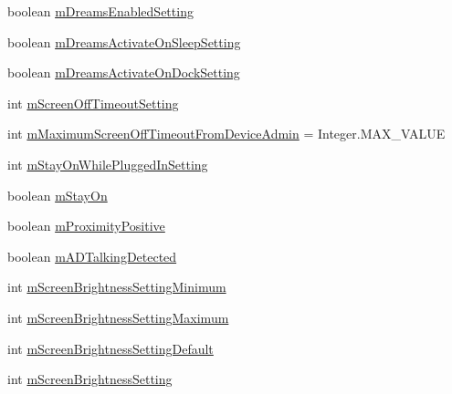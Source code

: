 \begin{DoxyCompactItemize}
\item 
boolean \hyperlink{classcom_1_1android_1_1server_1_1power_1_1PowerManagerService_a17c84b001198d25bddfbcd8cbc95dfa5}{m\-Dreams\-Enabled\-Setting}
\item 
boolean \hyperlink{classcom_1_1android_1_1server_1_1power_1_1PowerManagerService_a3c5fd5e8ef073be5e16dc75a0be9ee72}{m\-Dreams\-Activate\-On\-Sleep\-Setting}
\item 
boolean \hyperlink{classcom_1_1android_1_1server_1_1power_1_1PowerManagerService_a95fc861cdbe061af7dac579eee692186}{m\-Dreams\-Activate\-On\-Dock\-Setting}
\item 
int \hyperlink{classcom_1_1android_1_1server_1_1power_1_1PowerManagerService_aff54ed9e71f038ade439d18f68df1693}{m\-Screen\-Off\-Timeout\-Setting}
\item 
int \hyperlink{classcom_1_1android_1_1server_1_1power_1_1PowerManagerService_a4568ee32633119012abb8ba1778d322d}{m\-Maximum\-Screen\-Off\-Timeout\-From\-Device\-Admin} = Integer.\-M\-A\-X\-\_\-\-V\-A\-L\-U\-E
\item 
int \hyperlink{classcom_1_1android_1_1server_1_1power_1_1PowerManagerService_a6315de1c3522ae67c89c610c3ad25027}{m\-Stay\-On\-While\-Plugged\-In\-Setting}
\item 
boolean \hyperlink{classcom_1_1android_1_1server_1_1power_1_1PowerManagerService_a6232e1f32f3426014adc0bed62d0cb4f}{m\-Stay\-On}
\item 
boolean \hyperlink{classcom_1_1android_1_1server_1_1power_1_1PowerManagerService_a59d076d6594a3fad788a4cb2995eb193}{m\-Proximity\-Positive}
\item 
boolean \hyperlink{classcom_1_1android_1_1server_1_1power_1_1PowerManagerService_ab1be0e2ea03340f9160d118ab2bed62f}{m\-A\-D\-Talking\-Detected}
\item 
int \hyperlink{classcom_1_1android_1_1server_1_1power_1_1PowerManagerService_adda72145b07d6ed10a9d3c5e4fe3b0ff}{m\-Screen\-Brightness\-Setting\-Minimum}
\item 
int \hyperlink{classcom_1_1android_1_1server_1_1power_1_1PowerManagerService_aff9669ee980aff7d31c75d83a7c77a1c}{m\-Screen\-Brightness\-Setting\-Maximum}
\item 
int \hyperlink{classcom_1_1android_1_1server_1_1power_1_1PowerManagerService_ade01da168fceeaa1f2767acc30490519}{m\-Screen\-Brightness\-Setting\-Default}
\item 
int \hyperlink{classcom_1_1android_1_1server_1_1power_1_1PowerManagerService_a06fdba8431aca172de57d3c4a7e3585b}{m\-Screen\-Brightness\-Setting}
\item 

\end{DoxyCompactItemize}
